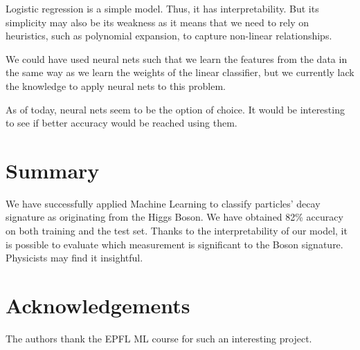 \documentclass[10pt,conference,compsocconf]{IEEEtran}
\begin{document}
Logistic regression is a simple model. Thus, it has interpretability. But its simplicity may also be its weakness as it means that we need to rely on heuristics, such as polynomial expansion, to capture non-linear relationships.

We could have used neural nets such that we learn the features from the data in the same way as we learn the weights of the linear classifier, but we currently lack the knowledge to apply neural nets to this problem.

As of today, neural nets seem to be the option of choice. It would be interesting to see if better accuracy would be reached using them.

\section{Summary}
We have successfully applied Machine Learning to classify particles' decay signature as originating from the Higgs Boson. We have obtained 82\% accuracy on both training and the test set. Thanks to the interpretability of our model, it is possible to evaluate which measurement is significant to the Boson signature. Physicists may find it insightful.

\section*{Acknowledgements}
The authors thank the EPFL ML course for such an interesting project.
\end{document}
